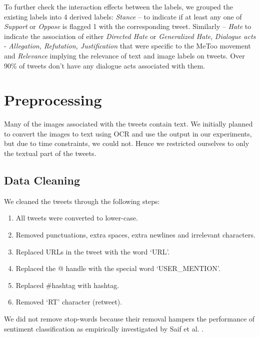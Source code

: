 	To further check the interaction effects between the labels, we grouped the existing labels into 4 derived labels: \textit{Stance} – to indicate if at least any one of \textit{Support} or \textit{Oppose} is flagged 1 with the corresponding tweet. Similarly – \textit{Hate} to indicate the association of either \textit{Directed Hate} or \textit{Generalized Hate}, \textit{Dialogue acts} - \textit{Allegation, Refutation, Justification} that were specific to the MeToo movement and \textit{Relevance} implying the relevance of text and image labels on tweets. Over 90\% of tweets don't have any dialogue acts associated with them.
	
\section{Preprocessing}\label{sec:preprocessing}
Many of the images associated with the tweets contain text. 
We initially planned to convert the images to text using OCR and use the output in our experiments, but due to time constraints, we could not. Hence we restricted ourselves to only the textual part of the tweets. 
	\subsection{Data Cleaning}
	We cleaned the tweets through the following steps:
	\begin{enumerate}
		\item  All tweets were converted to lower-case.
	\item 
	Removed punctuations, extra spaces, extra newlines and irrelevant characters. 
	\item    Replaced URLs in the tweet with the word `URL'.
	\item     Replaced the @ handle with the special word `USER\_MENTION'.
	\item      Replaced \#hashtag with hashtag.
	\item       Removed `RT' character (retweet).
	\end{enumerate}
	We did not remove stop-words because their removal hampers the performance of sentiment classification as empirically investigated by Saif et al. \cite{saif-etal-2014-stopwords}. 

